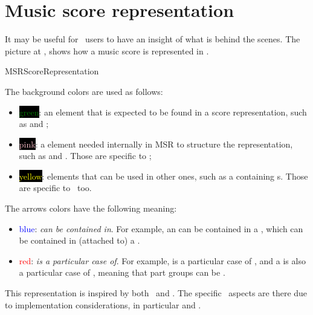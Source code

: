 



\chapter{Music score representation}\label{Music score representation}

It may be useful for \mf\ users to have an insight of what is behind the scenes.
The picture at , shows how a music score is represented in \msrRepr.

{MSRScoreRepresentation}

The background colors are used as follows:
\begin{itemize}
\item \colorbox{black}{\textcolor{green}{green}}: an element that is expected to be found in a score representation, such as  and ;

\item \colorbox{black}{\textcolor{pink}{pink}}: a element needed internally in MSR to structure the representation, such as  and . Those are specific to \mf;

\item \colorbox{black}{\textcolor{yellow}{yellow}}: elements that can be used in other ones, such as a  containing s. Those are specific to \mf\ too.
\end{itemize}

The arrows colors have the following meaning:
\begin{itemize}
\item \textcolor{blue}{blue}: {\it can be contained in}. For example, an  can be contained in a , which can be contained in (attached to) a .

\item \textcolor{red}{red}: {\it is a particular case of}. For example,  is a particular case of , and a  is also a particular case of , meaning that part groups can be .
\end{itemize}

This representation is inspired by both \mxml\ and \lily. The specific \mf\ aspects are there due to implementation considerations, in particular  and .
